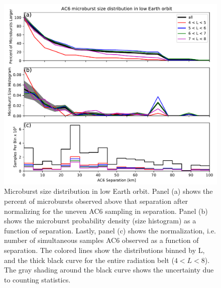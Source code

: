 \documentclass[draft]{agujournal2019}
\begin{document}
\begin{figure}
\includegraphics[width=\textwidth]{fig3.pdf}
\caption{Microburst size distribution in low Earth orbit. Panel (a) shows the percent of microbursts observed above that separation after normalizing for the uneven AC6 sampling in separation. Panel (b) shows the microburst probability density (size histogram) as a function of separation. Lastly, panel (c) shows the normalization, i.e. number of simultaneous samples AC6 observed as a function of separation. The colored lines show the distributions binned by L, and the thick black curve for the entire radiation belt ($4 < L < 8$). The gray shading around the black curve shows the uncertainty due to counting statistics.}
\label{fig3}
\end{figure}
\end{document}
